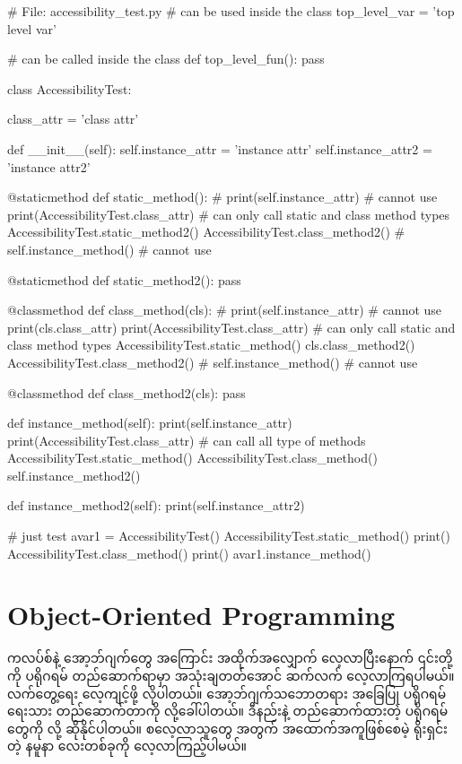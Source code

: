 %
\begin{py}
# File: accessibility_test.py
# can be used inside the class
top_level_var = 'top level var'


# can be called inside the class
def top_level_fun():
    pass


class AccessibilityTest:

    class_attr = 'class attr'

    def __init__(self):
        self.instance_attr = 'instance  attr'
        self.instance_attr2 = 'instance  attr2'

    @staticmethod
    def static_method():
        # print(self.instance_attr)   # cannot use
        print(AccessibilityTest.class_attr)
        # can only call static and class method types
        AccessibilityTest.static_method2()
        AccessibilityTest.class_method2()
        # self.instance_method()      # cannot use

    @staticmethod
    def static_method2():
        pass

    @classmethod
    def class_method(cls):
        # print(self.instance_attr)  # cannot use
        print(cls.class_attr)
        print(AccessibilityTest.class_attr)
        # can only call static and class method types
        AccessibilityTest.static_method()
        cls.class_method2()
        AccessibilityTest.class_method2()
        # self.instance_method()      # cannot use

    @classmethod
    def class_method2(cls):
        pass

    def instance_method(self):
        print(self.instance_attr)
        print(AccessibilityTest.class_attr)
        # can call all type of methods
        AccessibilityTest.static_method()
        AccessibilityTest.class_method()
        self.instance_method2()

    def instance_method2(self):
        print(self.instance_attr2)


# just test
avar1 = AccessibilityTest()
AccessibilityTest.static_method()
print()
AccessibilityTest.class_method()
print()
avar1.instance_method()
\end{py}
%

\section{Object-Oriented Programming}
ကလပ်စ်နဲ့ အော့ဘ်ဂျက်တွေ အကြောင်း အထိုက်အလျှောက် လေ့လာပြီးနောက် ၎င်းတို့ကို ပရိုဂရမ် တည်\allowbreak ဆောက်ရာမှာ အသုံးချတတ်အောင် ဆက်လက် လေ့လာကြရပါမယ်။ လက်တွေ့ရေး လေ့ကျင့်ဖို့ လိုပါတယ်။ အော့ဘ်ဂျက်သဘောတရား အခြေပြု ပရိုဂရမ်ရေးသား တည်ဆောက်တာကို  လို့ခေါ်ပါတယ်။ ဒီနည်းနဲ့ တည်ဆောက်ထားတဲ့ ပရိုဂရမ်တွေကို  လို့ ဆိုနိုင်ပါတယ်။ စလေ့လာသူတွေ အတွက် အထောက်အကူဖြစ်စေမဲ့ ရိုးရှင်းတဲ့ နမူနာ  လေးတစ်ခုကို လေ့လာကြည့်ပါမယ်။ 

